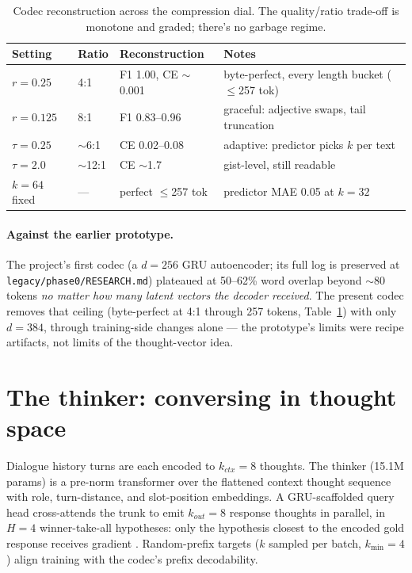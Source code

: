 \documentclass[11pt]{article}
\begin{document}
\begin{table}[h]
\centering
\small
\begin{tabular}{llll}
\toprule
Setting & Ratio & Reconstruction & Notes \\
\midrule
$r{=}0.25$ & 4:1 & F1 1.00, CE $\sim$0.001 & byte-perfect, every length bucket ($\leq$257 tok) \\
$r{=}0.125$ & 8:1 & F1 0.83--0.96 & graceful: adjective swaps, tail truncation \\
$\tau{=}0.25$ & $\sim$6:1 & CE 0.02--0.08 & adaptive: predictor picks $k$ per text \\
$\tau{=}2.0$ & $\sim$12:1 & CE $\sim$1.7 & gist-level, still readable \\
$k{=}64$ fixed & --- & perfect $\leq$257 tok & predictor MAE 0.05 at $k{=}32$ \\
\bottomrule
\end{tabular}
\caption{Codec reconstruction across the compression dial. The quality/ratio
trade-off is monotone and graded; there's no garbage regime.}
\label{tab:codec}
\end{table}

\paragraph{Against the earlier prototype.} The project's first codec (a
$d{=}256$ GRU autoencoder; its full log is preserved at
\texttt{legacy/phase0/RESEARCH.md}) plateaued at 50--62\% word overlap
beyond $\sim$80 tokens \emph{no matter how many latent vectors the decoder
received}. The present codec removes that ceiling (byte-perfect at 4:1
through 257 tokens, Table~\ref{tab:codec}) with only $d{=}384$, through
training-side changes alone --- the prototype's limits were recipe
artifacts, not limits of the thought-vector idea.

\section{The thinker: conversing in thought space}
\label{sec:thinker}

Dialogue history turns are each encoded to $k_{ctx}{=}8$ thoughts. The
thinker (15.1M params) is a pre-norm transformer over the flattened context
thought sequence with role, turn-distance, and slot-position embeddings. A
GRU-scaffolded query head cross-attends the trunk to emit $k_{out}{=}8$
response thoughts in parallel, in $H{=}4$ winner-take-all hypotheses: only
the hypothesis closest to the encoded gold response receives gradient
\citep{guzman2012mcl}. Random-prefix targets ($k$ sampled per batch,
$k_{\min}{=}4$) align training with the codec's prefix decodability.
\end{document}
